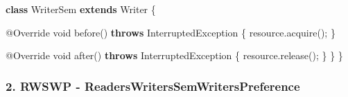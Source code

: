 \documentclass[
]{article}
\newenvironment{Shaded}{\begin{snugshade}}{\end{snugshade}}
\newcommand{\AttributeTok}[1]{\textcolor[rgb]{0.77,0.63,0.00}{#1}}
\newcommand{\BuiltInTok}[1]{#1}
\newcommand{\DataTypeTok}[1]{\textcolor[rgb]{0.13,0.29,0.53}{#1}}
\newcommand{\FunctionTok}[1]{\textcolor[rgb]{0.00,0.00,0.00}{#1}}
\newcommand{\KeywordTok}[1]{\textcolor[rgb]{0.13,0.29,0.53}{\textbf{#1}}}
\newcommand{\NormalTok}[1]{#1}
\begin{document}
\begin{Shaded}
\begin{Highlighting}[]
    \KeywordTok{class}\NormalTok{ WriterSem }\KeywordTok{extends} \BuiltInTok{Writer}\NormalTok{ \{}

        \AttributeTok{@Override}
        \DataTypeTok{void} \FunctionTok{before}\NormalTok{() }\KeywordTok{throws} \BuiltInTok{InterruptedException}\NormalTok{ \{}
\NormalTok{            resource.}\FunctionTok{acquire}\NormalTok{();}
\NormalTok{        \}}

        \AttributeTok{@Override}
        \DataTypeTok{void} \FunctionTok{after}\NormalTok{() }\KeywordTok{throws} \BuiltInTok{InterruptedException}\NormalTok{ \{}
\NormalTok{            resource.}\FunctionTok{release}\NormalTok{();}
\NormalTok{        \}}
\NormalTok{    \}}
\NormalTok{\}}
\end{Highlighting}
\end{Shaded}

\hypertarget{rwswp---readerswriterssemwriterspreference}{%
\subsubsection{2. RWSWP -
ReadersWritersSemWritersPreference}\label{rwswp---readerswriterssemwriterspreference}}
\end{document}
